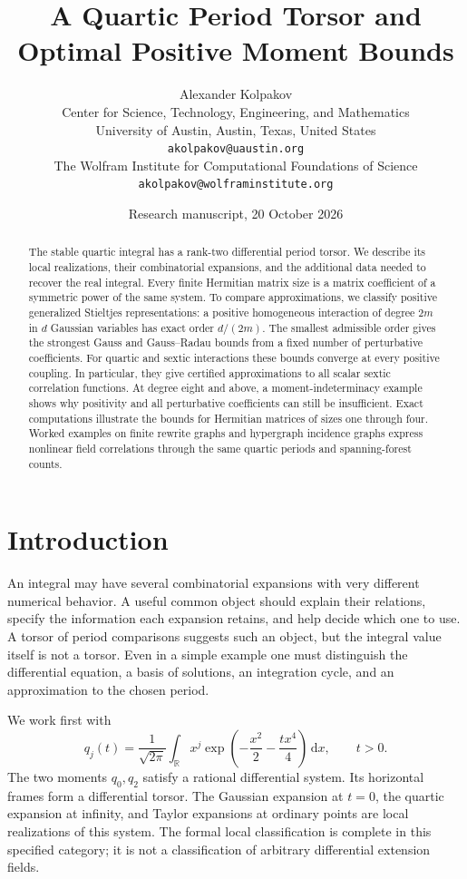 \documentclass[11pt]{article}
\title{A Quartic Period Torsor and Optimal Positive Moment Bounds}
\author{Alexander Kolpakov\\[0.5ex]
\small Center for Science, Technology, Engineering, and Mathematics\\
\small University of Austin, Austin, Texas, United States\\
\small \texttt{akolpakov@uaustin.org}\\[0.75ex]
\small The Wolfram Institute for Computational Foundations of Science\\
\small \texttt{akolpakov@wolframinstitute.org}}
\date{Research manuscript, 20 October 2026}
\theoremstyle{definition}
\newcommand{\dd}{\,\mathrm d}
\numberwithin{equation}{section}
\begin{document}
\maketitle
\begin{abstract}
The stable quartic integral has a rank-two differential period torsor.
We describe its local realizations, their combinatorial expansions, and the
additional data needed to recover the real integral. Every finite Hermitian
matrix size is a matrix coefficient of a symmetric power of the same system.
To compare approximations, we classify positive generalized Stieltjes
representations: a positive homogeneous interaction of degree $2m$ in $d$
Gaussian variables has exact order $d/(2m)$. The smallest admissible order
gives the strongest Gauss and Gauss--Radau bounds from a fixed number of
perturbative coefficients. For quartic and sextic interactions these bounds
converge at every positive coupling. In particular, they give certified
approximations to all scalar sextic correlation functions. At degree eight
and above, a moment-indeterminacy example shows why positivity and all
perturbative coefficients can still be insufficient. Exact computations
illustrate the bounds for Hermitian matrices of sizes one through four.
Worked examples on finite rewrite graphs and hypergraph incidence graphs
express nonlinear field correlations through the same quartic periods
and spanning-forest counts.
\end{abstract}

\section{Introduction}
An integral may have several combinatorial expansions with very different
numerical behavior. A useful common object should explain their relations,
specify the information each expansion retains, and help decide which one
to use. A torsor of period comparisons suggests such an object, but the
integral value itself is not a torsor. Even in a simple example one must
distinguish the differential equation, a basis of solutions, an integration
cycle, and an approximation to the chosen period.

We work first with
\begin{equation}\label{eq:scalar}
 q_j(t)=\frac1{\sqrt{2\pi}}\int_{\mathbb R}
 x^j\exp\left(-\frac{x^2}{2}-\frac{t x^4}{4}\right)\dd x,
 \qquad t>0.
\end{equation}
The two moments $q_0,q_2$ satisfy a rational differential system. Its
horizontal frames form a differential torsor. The Gaussian expansion at
$t=0$, the quartic expansion at infinity, and Taylor expansions at ordinary
points are local realizations of this system. The formal local
classification is complete in this specified category; it is not a
classification of arbitrary differential extension fields.
\end{document}

